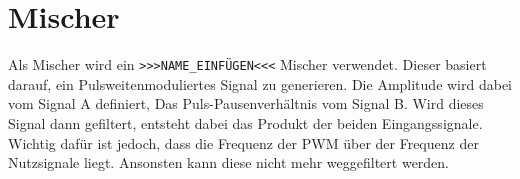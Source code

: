 \section{Mischer}
Als Mischer wird ein \verb?>>>NAME_EINFÜGEN<<<? Mischer verwendet. Dieser 
basiert darauf, ein Pulsweitenmoduliertes Signal zu generieren. Die Amplitude 
wird dabei vom Signal A definiert, Das Puls-Pausenverhältnis vom Signal B. 
Wird dieses Signal dann gefiltert, entsteht dabei das Produkt der beiden 
Eingangssignale. Wichtig dafür ist jedoch, dass die Frequenz der PWM über 
der Frequenz der Nutzsignale liegt. Ansonsten kann diese nicht mehr 
weggefiltert werden. 

